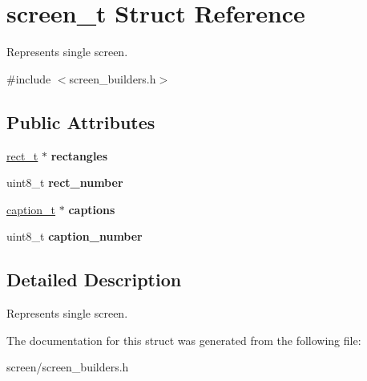 \hypertarget{structscreen__t}{}\section{screen\+\_\+t Struct Reference}
\label{structscreen__t}


Represents single screen.  




{\ttfamily \#include $<$screen\+\_\+builders.\+h$>$}

\subsection*{Public Attributes}
\begin{DoxyCompactItemize}
\item 
\hyperlink{structrect__t}{rect\+\_\+t} $\ast$ {\bfseries rectangles}\hypertarget{structscreen__t_ab76ecd37a7ec52f2efcee775b4797236}{}\label{structscreen__t_ab76ecd37a7ec52f2efcee775b4797236}

\item 
uint8\+\_\+t {\bfseries rect\+\_\+number}\hypertarget{structscreen__t_a70c9aae8bf36b723bdfd3dd474c91326}{}\label{structscreen__t_a70c9aae8bf36b723bdfd3dd474c91326}

\item 
\hyperlink{structcaption__t}{caption\+\_\+t} $\ast$ {\bfseries captions}\hypertarget{structscreen__t_a91256281b8702a8d182d1a0a4357f998}{}\label{structscreen__t_a91256281b8702a8d182d1a0a4357f998}

\item 
uint8\+\_\+t {\bfseries caption\+\_\+number}\hypertarget{structscreen__t_a8a72a4a10436b2fa4f8430b762531d10}{}\label{structscreen__t_a8a72a4a10436b2fa4f8430b762531d10}

\end{DoxyCompactItemize}


\subsection{Detailed Description}
Represents single screen. 

The documentation for this struct was generated from the following file\+:\begin{DoxyCompactItemize}
\item 
screen/screen\+\_\+builders.\+h\end{DoxyCompactItemize}
